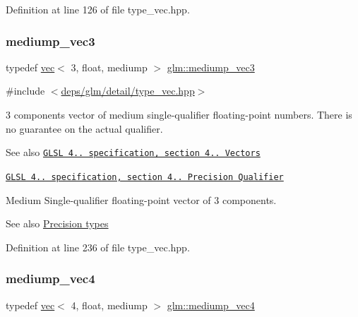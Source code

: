 Definition at line 126 of file type\+\_\+vec.\+hpp.

\mbox{\label{group__core__precision_ga709e6ab33a5deb4a42ce9fcde75655f3}} 
\subsubsection{\texorpdfstring{mediump\+\_\+vec3}{mediump\_vec3}}
{\footnotesize\ttfamily typedef \hyperlink{structglm_1_1vec}{vec}$<$ 3, float, mediump $>$ \hyperlink{group__core__precision_ga709e6ab33a5deb4a42ce9fcde75655f3}{glm\+::mediump\+\_\+vec3}}



{\ttfamily \#include $<$\hyperlink{type__vec_8hpp}{deps/glm/detail/type\+\_\+vec.\+hpp}$>$}

3 components vector of medium single-\/qualifier floating-\/point numbers. There is no guarantee on the actual qualifier.

\begin{DoxySeeAlso}{See also}
\href{http://www.opengl.org/registry/doc/GLSLangSpec.4.20.8.pdf}{\tt G\+L\+SL 4.. specification, section 4.. Vectors} 

\href{http://www.opengl.org/registry/doc/GLSLangSpec.4.20.8.pdf}{\tt G\+L\+SL 4.. specification, section 4.. Precision Qualifier}
\end{DoxySeeAlso}
Medium Single-\/qualifier floating-\/point vector of 3 components. \begin{DoxySeeAlso}{See also}
\hyperlink{group__core__precision}{Precision types} 
\end{DoxySeeAlso}


Definition at line 236 of file type\+\_\+vec.\+hpp.

\mbox{\label{group__core__precision_gaf165f9c36fb7832b79ddf7d56af3c54f}} 
\subsubsection{\texorpdfstring{mediump\+\_\+vec4}{mediump\_vec4}}
{\footnotesize\ttfamily typedef \hyperlink{structglm_1_1vec}{vec}$<$ 4, float, mediump $>$ \hyperlink{group__core__precision_gaf165f9c36fb7832b79ddf7d56af3c54f}{glm\+::mediump\+\_\+vec4}}




